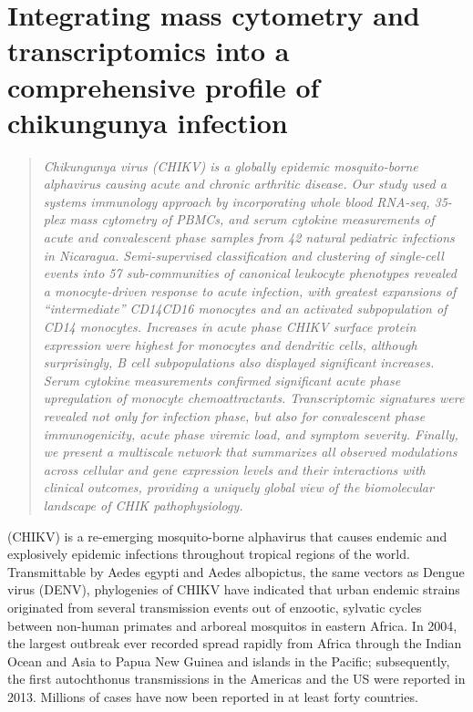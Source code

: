 
\chapter{Integrating mass cytometry and transcriptomics into a comprehensive profile of chikungunya infection}
\label{chap:chik}

\newcommand{\subcommunity}{sub-\allowbreak com\-mu\-ni\-ty}
\newcommand{\subcommunities}{sub-\allowbreak com\-mu\-ni\-ties}
\newcommand{\Subcommunities}{Sub-\allowbreak com\-mu\-ni\-ties}
\newcommand{\pertranscript}{per-\allowbreak trans\-cript}

\begin{quote}
\emph{Chikungunya virus (CHIKV) is a globally epidemic mosquito-borne alphavirus causing acute and chronic arthritic disease. Our study used a systems immunology approach by incorporating whole blood RNA-seq, 35-plex mass cytometry of PBMCs, and serum cytokine measurements of acute and convalescent phase samples from 42 natural pediatric infections in Nicaragua. Semi-supervised classification and clustering of single-cell events into 57 \subcommunities{} of canonical leukocyte phenotypes revealed a monocyte-driven response to acute infection, with greatest expansions of “intermediate” CD14\sups{++}\allowbreak CD16\sups{+} monocytes and an activated subpopulation of CD14\sups{+} monocytes. Increases in acute phase CHIKV surface protein expression were highest for monocytes and dendritic cells, although surprisingly, B cell subpopulations also displayed significant increases. Serum cytokine measurements confirmed significant acute phase upregulation of monocyte chemoattractants. Transcriptomic signatures were revealed not only for infection phase, but also for convalescent phase immunogenicity, acute phase viremic load, and symptom severity. Finally, we present a multiscale network that summarizes all observed modulations across cellular and gene expression levels and their interactions with clinical outcomes, providing a uniquely global view of the biomolecular landscape of CHIK pathophysiology.}
\end{quote}

 (CHIKV) is a re-emerging mosquito-borne alphavirus that causes endemic and explosively epidemic infections throughout tropical regions of the world.\autocite{Weaver2015} Transmittable by Aedes egypti and Aedes albopictus, the same vectors as Dengue virus (DENV), phylogenies of CHIKV have indicated that urban endemic strains originated from several transmission events out of enzootic, sylvatic cycles between non-human primates and arboreal mosquitos in eastern Africa.\autocite{Volk2010} In 2004, the largest outbreak ever recorded spread rapidly from Africa through the Indian Ocean and Asia to Papua New Guinea and islands in the Pacific; subsequently, the first autochthonus transmissions in the Americas and the US were reported in 2013.\autocite{Nasci2014} Millions of cases have now been reported in at least forty countries.\autocite{Suhrbier2012}

